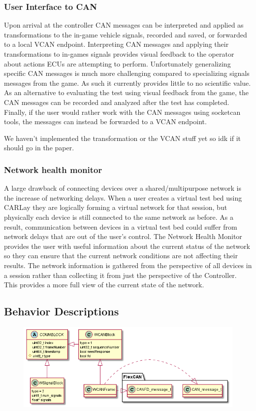 \documentclass[letterpaper,twocolumn,12pt]{article}
\begin{document}
\subsubsection{User Interface to CAN}
Upon arrival at the controller CAN messages can be interpreted and applied as transformations to the in-game vehicle signals, recorded and saved, or forwarded to a local VCAN endpoint. Interpreting CAN messages and applying their transformations to in-games signals provides visual feedback to the operator about actions ECUs are attempting to perform. Unfortunately generalizing specific CAN messages is much more challenging compared to specializing signals messages from the game. As such it currently provides little to no scientific value. As an alternative to evaluating the test using visual feedback from the game, the CAN messages can be recorded and analyzed after the test has completed. Finally, if the user would rather work with the CAN messages using socketcan tools, the messages can instead be forwarded to a VCAN endpoint.
    
We haven't implemented the transformation or the VCAN stuff yet so idk if it should go in the paper.

\subsubsection{Network health monitor}
A large drawback of connecting devices over a shared/multipurpose network is the increase of networking delays. When a user creates a virtual test bed using CARLay they are logically forming a virtual network for that session, but physically each device is still connected to the same network as before. As a result, communication between devices in a virtual test bed could suffer from network delays that are out of the user’s control. The Network Health Monitor provides the user with useful information about the current status of the network so they can ensure that the current network conditions are not affecting their results. The network information is gathered from the perspective of all devices in a session rather than collecting it from just the perspective of the Controller. This provides a more full view of the current state of the network.

\subsection{Behavior Descriptions}
\begin{figure}[t!]
    \centering
    \includegraphics[width=\linewidth]{out/images/data_structures/data_structures.png}
    \caption{}
    \label{fig:}
\end{figure}
\end{document}
